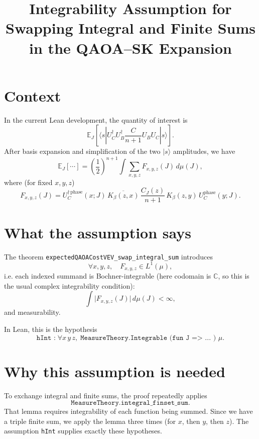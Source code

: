 \documentclass[11pt]{article}
\title{Integrability Assumption for Swapping Integral and Finite Sums\\in the QAOA--SK Expansion}
\author{}
\date{}
\begin{document}
	\maketitle
	
	\section*{Context}
	In the current Lean development, the quantity of interest is
	\begin{equation}
		\mathbb{E}_{J}\!\left[\langle s|U_C^\dagger U_B^\dagger \frac{C}{n+1} U_B U_C|s\rangle\right].
	\end{equation}
	After basis expansion and simplification of the two $|s\rangle$ amplitudes, we have
	\begin{equation}
		\mathbb{E}_{J}[\cdots]
		=
		\left(\frac12\right)^{n+1}
		\int
		\sum_{x,y,z}
		F_{x,y,z}(J)\,d\mu(J),
		\label{eq:before-swap}
	\end{equation}
	where (for fixed $x,y,z$)
	\begin{equation}
		F_{x,y,z}(J)
		=
		U_C^{\dagger\,\mathrm{phase}}(x;J)
		\,\overline{K_\beta(z,x)}
		\,\frac{C_J(z)}{n+1}
		\,K_\beta(z,y)
		\,U_C^{\mathrm{phase}}(y;J).
	\end{equation}
	
	\section*{What the assumption says}
	The theorem \texttt{expectedQAOACostVEV\_swap\_integral\_sum} introduces
	\begin{equation}
		\forall x,y,z,\quad F_{x,y,z} \in L^1(\mu),
	\end{equation}
	i.e. each indexed summand is Bochner-integrable (here codomain is $\mathbb{C}$, so this is the usual complex integrability condition):
	\begin{equation}
		\int \lvert F_{x,y,z}(J)\rvert\,d\mu(J) < \infty,
	\end{equation}
	and measurability.
	
	In Lean, this is the hypothesis
	\begin{equation}
		\texttt{hInt :}\; \forall x\,y\,z,\; \texttt{MeasureTheory.Integrable (fun J => ... ) $\mu$}.
	\end{equation}
	
	\section*{Why this assumption is needed}
	To exchange integral and finite sums, the proof repeatedly applies
	\begin{equation}
		\texttt{MeasureTheory.integral\_finset\_sum}.
	\end{equation}
	That lemma requires integrability of each function being summed. Since we have a triple finite sum, we apply the lemma three times (for $x$, then $y$, then $z$). The assumption \texttt{hInt} supplies exactly these hypotheses.
	
\end{document}

